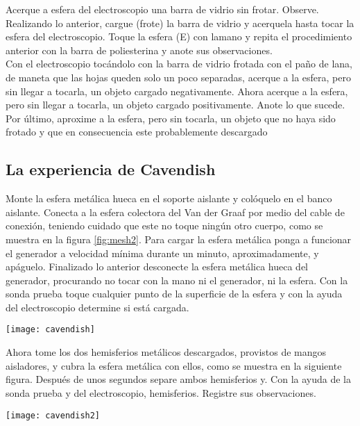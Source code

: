 \documentclass[11pt]{article}
\newenvironment{Figuras}
  {\par\medskip\noindent\minipage{\linewidth}}
  {\endminipage\par\medskip}
\begin{document}
\begin{multicols}{2}
Acerque a esfera del electroscopio una barra de vidrio sin frotar. Observe. Realizando lo anterior, cargue (frote) la barra de vidrio y acerquela hasta tocar la esfera del electroscopio.  Toque la esfera (E) con lamano y repita el procedimiento anterior con la barra de poliesterina y anote sus observaciones.\\

Con el electroscopio tocándolo con la barra de vidrio frotada con el paño de lana, de maneta que las hojas queden solo un poco separadas, acerque a la esfera, pero sin llegar a tocarla, un objeto cargado negativamente. Ahora acerque a la esfera, pero sin llegar a tocarla, un objeto cargado positivamente.  Anote lo que sucede. Por último, aproxime a la esfera, pero sin tocarla, un objeto que no haya sido frotado y que en consecuencia este probablemente descargado \\

	\subsection{La experiencia de Cavendish}
		Monte la esfera metálica hueca en el soporte aislante y colóquelo en el banco aislante. Conecta a la esfera colectora del Van der Graaf por medio del cable de conexión, teniendo cuidado que este no toque ningún otro cuerpo, como se muestra en la figura \ref{fig:mesh2}. Para cargar la esfera metálica ponga a funcionar el generador a velocidad mínima durante un minuto, aproximadamente, y apáguelo. Finalizado lo anterior desconecte la esfera metálica hueca del generador, procurando no tocar con la mano ni el generador, ni la esfera. Con la sonda prueba toque cualquier punto de la superficie de la esfera y con la ayuda del electroscopio determine si está cargada.\\

\begin{Figuras}
	\centering
    \texttt{[image: cavendish]}
    \label{fig:mesh2}
\end{Figuras}

Ahora tome los dos hemisferios metálicos descargados, provistos de mangos aisladores, y cubra la esfera metálica con ellos, como se muestra en la siguiente figura. Después de unos segundos separe ambos hemisferios y. Con la ayuda de la sonda prueba y del electroscopio, hemisferios. Registre sus observaciones.

\begin{Figuras}
	\centering
    \texttt{[image: cavendish2]}
    \label{fig:mesh3}
\end{Figuras}



\end{multicols}
\end{document}
